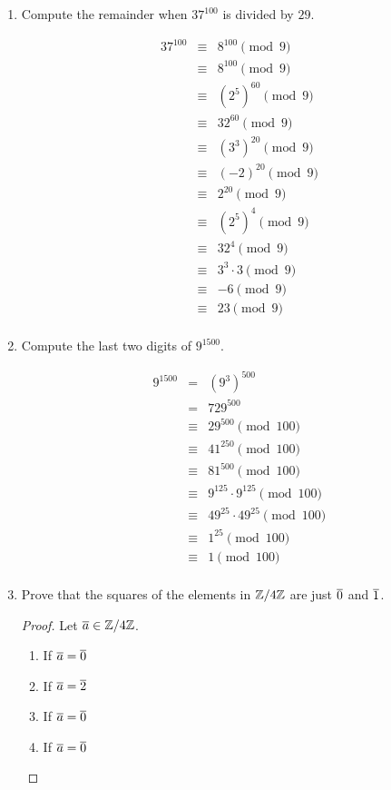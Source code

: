 \begin{enumerate}
\begin{proof}
		Base case: $10^1\equiv 1 \pmod 9$ is clear.
		
		Induction step: Assume that $10^{n}\equiv 1 \pmod 9$.  Then $$10^{n+1} = 10\cdot 10^n \equiv 1\cdot 1 \pmod 9 \equiv 1\pmod 9$$
		We can therefore use the fact that to conclude that $a \equiv a_n + a_{n-1} + ... + a_1 + a_0 \pmod 9$.
	\end{proof}
	\item Compute the remainder when $37^{100}$ is divided by $29$.
	\begin{sln}
		\begin{align*}
			37^{100}& \equiv& 8^{100} \pmod 9\\
			& \equiv& 8^{100} \pmod 9\\
			& \equiv& (2^5)^{60} \pmod 9\\
			& \equiv& 32^{60} \pmod 9\\
			& \equiv& (3^3)^{20} \pmod 9\\
			& \equiv& (-2)^{20} \pmod 9\\
			& \equiv& 2^{20} \pmod 9\\
			& \equiv& (2^5)^4 \pmod 9\\
			& \equiv& 32^4 \pmod 9\\
			& \equiv& 3^3\cdot 3 \pmod 9\\
			& \equiv& -6 \pmod 9\\
			& \equiv& 23 \pmod 9\\
		\end{align*}
	\end{sln}
	\item Compute the last two digits of $9^{1500}$. 
	\begin{sln}
		\begin{align*}
		9^{1500}& = & (9^3)^{500}\\
		& = & 729^{500} \\
		& \equiv& 29^{500} \pmod {100} \\
		& \equiv& 41^{250} \pmod {100} \\
		& \equiv& 81^{500} \pmod {100} \\
		& \equiv& 9^{125}\cdot 9^{125} \pmod {100} \\
		& \equiv& 49^{25}\cdot 49^{25} \pmod {100} \\
		& \equiv& 1^{25} \pmod {100} \\
		& \equiv& 1\pmod {100} \\
		\end{align*}
	\end{sln}
	\item Prove that the squares of the elements in $\mathbb{Z}/4\mathbb{Z}$  are just $\overline{0}$ and $\overline{1}$.
	\begin{proof}
		Let $\overline{a}\in\mathbb{Z}/4\mathbb{Z}$.
		\begin{enumerate}
			\item If $\overline{a} = \overline{0}$
			\item If $\overline{a} = \overline{2}$
			\item If $\overline{a} = \overline{0}$
			\item If $\overline{a} = \overline{0}$
		\end{enumerate}
	\end{proof}
	

\end{enumerate}
